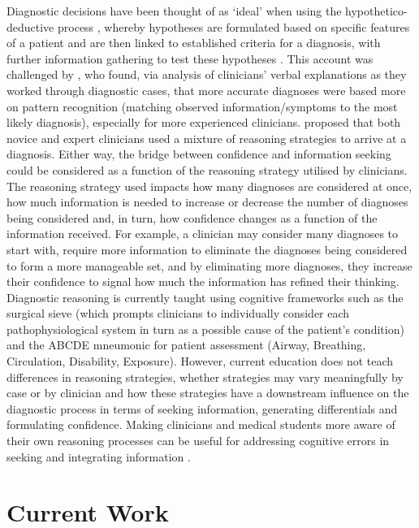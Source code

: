 \documentclass[a4paper, nobind]{templates/ociamthesis}
\begin{document}
\hfill\break
Diagnostic decisions have been thought of as `ideal' when using the hypothetico-deductive process \autocite{kuipers_causal_1984}, whereby hypotheses are formulated based on specific features of a patient and are then linked to established criteria for a diagnosis, with further information gathering to test these hypotheses \autocite{higgs_clinical_2019}. This account was challenged by \textcite{coderre_diagnostic_2003}, who found, via analysis of clinicians' verbal explanations as they worked through diagnostic cases, that more accurate diagnoses were based more on pattern recognition (matching observed information/symptoms to the most likely diagnosis), especially for more experienced clinicians. \autocite{gilhooly_cognitive_1990} proposed that both novice and expert clinicians used a mixture of reasoning strategies to arrive at a diagnosis. Either way, the bridge between confidence and information seeking could be considered as a function of the reasoning strategy utilised by clinicians. The reasoning strategy used impacts how many diagnoses are considered at once, how much information is needed to increase or decrease the number of diagnoses being considered and, in turn, how confidence changes as a function of the information received. For example, a clinician may consider many diagnoses to start with, require more information to eliminate the diagnoses being considered to form a more manageable set, and by eliminating more diagnoses, they increase their confidence to signal how much the information has refined their thinking. Diagnostic reasoning is currently taught using cognitive frameworks such as the surgical sieve (which prompts clinicians to individually consider each pathophysiological system in turn as a possible cause of the patient's condition) and the ABCDE mneumonic for patient assessment (Airway, Breathing, Circulation, Disability, Exposure). However, current education does not teach differences in reasoning strategies, whether strategies may vary meaningfully by case or by clinician and how these strategies have a downstream influence on the diagnostic process in terms of seeking information, generating differentials and formulating confidence. Making clinicians and medical students more aware of their own reasoning processes can be useful for addressing cognitive errors in seeking and integrating information \autocite{nendaz_diagnostic_2012}.

\section*{Current Work}\label{current-work}
\end{document}
